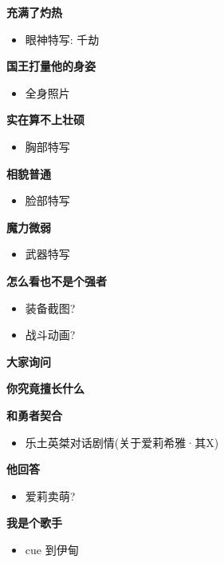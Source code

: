 \documentclass[a4paper]{article}
\begin{document}
\textbf{充满了灼热}

\begin{itemize}
    \item 眼神特写: 千劫
\end{itemize}

\textbf{国王打量他的身姿}

\begin{itemize}
    \item 全身照片
\end{itemize}

\textbf{实在算不上壮硕}

\begin{itemize}
    \item 胸部特写
\end{itemize}

\textbf{相貌普通}

\begin{itemize}
    \item 脸部特写
\end{itemize}

\textbf{魔力微弱}

\begin{itemize}
    \item 武器特写
\end{itemize}

\textbf{怎么看也不是个强者}

\begin{itemize}
    \item 装备截图?
    \item 战斗动画?
\end{itemize}

\textbf{大家询问}

\textbf{你究竟擅长什么}

\textbf{和勇者契合}

\begin{itemize}
    \item 乐土英桀对话剧情(关于爱莉希雅·其X)
\end{itemize}

\textbf{他回答}

\begin{itemize}
    \item 爱莉卖萌?
\end{itemize}

\textbf{我是个歌手}

\begin{itemize}
    \item cue 到伊甸
\end{itemize}
\end{document}

